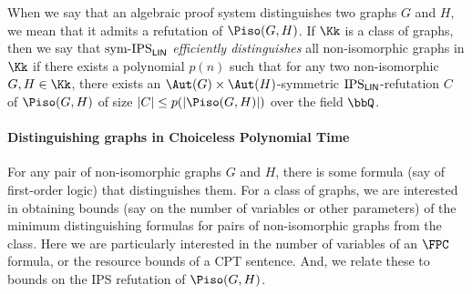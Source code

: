 \documentclass[a4paper,UKenglish,cleveref, autoref, thm-restate]{lipics-v2021}
\newcommand{\IPSlin}{\text{\upshape IPS}_{\mathsf{LIN}}}
\newcommand{\symIPSlin}{\text{ \upshape sym-IPS}_{\mathsf{LIN}}}
\begin{document}
When we say that an algebraic proof system distinguishes two graphs $G$ and $H$, we mean that it admits a refutation of $\Piso(G,H)$. 
If $\Kk$ is a class of graphs, then we say that$\symIPSlin$ \emph{efficiently distinguishes} all non-isomorphic graphs in $\Kk$ if there exists a polynomial $p(n)$ such that for any two non-isomorphic $G,H \in \Kk$, there exists an $\Aut(G) \times \Aut(H)$-symmetric $\IPSlin$-refutation $C$ of $\Piso(G,H)$ of size $|C| \leq p(|\Piso(G,H)|)$ over the field $\bbQ$.

\paragraph*{Distinguishing graphs in Choiceless Polynomial Time}
For any pair of non-isomorphic graphs $G$ and $H$, there is some formula (say of first-order logic) that distinguishes them.  For a class of graphs, we are interested in obtaining bounds (say on the number of variables or other parameters) of the minimum distinguishing formulas for pairs of non-isomorphic graphs from the class.  Here we are particularly interested in the number of variables of an $\FPC$ formula, or the resource bounds of a CPT sentence.  And, we relate these to bounds on the IPS refutation of $\Piso(G,H)$.
\end{document}
